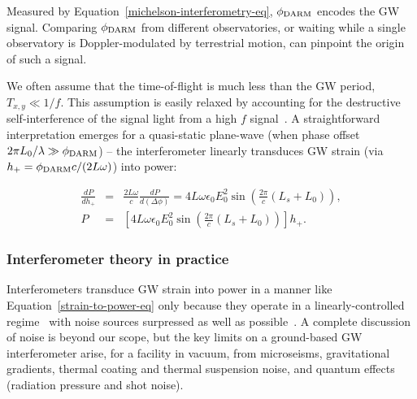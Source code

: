 \noindent Measured by Equation~\ref{michelson-interferometry-eq}, $\phi_{\textup{DARM}}$ encodes the GW signal.
Comparing $\phi_{\textup{DARM}}$ from different observatories, or waiting while a single observatory is Doppler-modulated by terrestrial motion, can pinpoint the origin of such a signal.

We often assume that the time-of-flight is much less than the GW period, $T_{x,y} \ll 1/f$.
This assumption is easily relaxed by accounting for the destructive self-interference of the signal light from a high $f$ signal~\cite{Saulson}.
A straightforward interpretation emerges for a quasi-static plane-wave (when phase offset $2\pi L_0/\lambda \gg \phi_\textup{DARM}$) -- the interferometer linearly transduces GW strain (via $h_+ = \phi_\textup{DARM}c/(2L\omega)$) into power:

\begin{eqnarray}
\frac{d P}{d h_+} &=& \frac{2L\omega}{c}\frac{dP}{d(\Delta\phi)} = 4 L\omega \epsilon_0 E_0^2 \sin \left(\frac{2\pi}{c} (L_s+L_0) \right),\\
P &=& \left[ 4 L \omega \epsilon_0 E_0^2 \sin \left(\frac{2\pi}{c} (L_s+L_0) \right) \right] h_+.
\label{strain-to-power-eq}
\end{eqnarray}




            \subsubsection{Interferometer theory in practice}
            \label{interferometer_theory}

Interferometers transduce GW strain into power in a manner like Equation~\ref{strain-to-power-eq} only because they operate in a linearly-controlled regime~\cite{FrickeThesis} with noise sources surpressed as well as possible~\cite{Saulson,LIGOWorks}.
A complete discussion of noise is beyond our scope, but the key limits on a ground-based GW interferometer arise, for a facility in vacuum, from microseisms, gravitational gradients, thermal coating and thermal suspension noise, and quantum effects (radiation pressure and shot noise).

